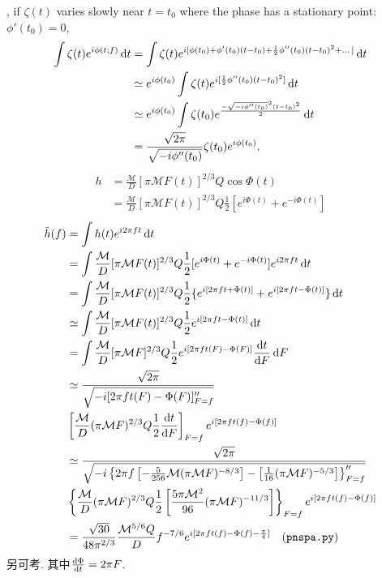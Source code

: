 \cite{Poisson1995}, if $\zeta(t)$ varies slowly near $t=t_0$ where the phase has a stationary point: $\phi'(t_0)=0$,
\begin{align}
    \int\zeta(t)e^{i\phi(t;f)}\,\mathrm{d} t&=\int\zeta(t)e^{i[\phi(t_0)+\phi'(t_0)(t-t_0)+\frac{1}{2}\phi''(t_0)(t-t_0)^2+\dots]}\,\mathrm{d} t\\
    &\simeq e^{i\phi(t_0)}\int\zeta(t)e^{i[\frac{1}{2}\phi''(t_0)(t-t_0)^2]}\,\mathrm{d} t\\
    &\simeq e^{i\phi(t_0)}\int\zeta(t_0)e^{\frac{-\sqrt{-i\phi''(t_0)}^2(t-t_0)^2}{2}}\,\mathrm{d} t\\
    &=\frac{\sqrt{2\pi}}{\sqrt{-i\phi''(t_0)}}\zeta(t_0)e^{i\phi(t_0)}.
\end{align}
\begin{align}
    h&=\frac{\mathcal{M}}{D}[\pi \mathcal{M}F(t)]^{2/3}Q\cos\Phi(t)\\
    &=\frac{\mathcal{M}}{D}[\pi \mathcal{M}F(t)]^{2/3}Q\frac{1}{2}[e^{i\Phi(t)}+e^{-i\Phi(t)}]
\end{align}
\begin{align}
    \tilde{h}(f)&=\int h(t)e^{i2\pi ft}\,\mathrm{d} t\\
    &=\int \frac{\mathcal{M}}{D}[\pi \mathcal{M}F(t)]^{2/3}Q\frac{1}{2}[e^{i\Phi(t)}+e^{-i\Phi(t)}]e^{i2\pi ft}\,\mathrm{d} t\\
    &=\int\frac{\mathcal{M}}{D}[\pi \mathcal{M}F(t)]^{2/3}Q\frac{1}{2}\{e^{i[2\pi ft+\Phi(t)]}+e^{i[2\pi ft-\Phi(t)]}\}\,\mathrm{d} t\\
    &\simeq\int\frac{\mathcal{M}}{D}[\pi \mathcal{M}F(t)]^{2/3}Q\frac{1}{2}e^{i[2\pi ft-\Phi(t)]}\,\mathrm{d} t\\
    &=\int\frac{\mathcal{M}}{D}[\pi \mathcal{M}F]^{2/3}Q\frac{1}{2}e^{i[2\pi ft(F)-\Phi(F)]}\frac{\mathrm{d} t}{\mathrm{d} F}\,\mathrm{d} F\\
    &\simeq\frac{\sqrt{2\pi}}{\sqrt{-i[2\pi ft(F)-\Phi(F)]''_{F=f}}}\\
    &\left[\frac{\mathcal{M}}{D}(\pi \mathcal{M}F)^{2/3}Q\frac{1}{2}\frac{\mathrm{d} t}{\mathrm{d} F}\right]_{F=f}e^{i[2\pi ft(f)-\Phi(f)]}\\
    &\simeq\frac{\sqrt{2\pi}}{\sqrt{-i\left\{2\pi f\left[-\frac{5}{256}\mathcal{M}(\pi \mathcal{M} F)^{-8/3}\right]-\left[\frac{1}{16}(\pi\mathcal{M} F)^{-5/3}\right]\right\}''_{F=f}}}\\
    &\left\{\frac{\mathcal{M}}{D}(\pi \mathcal{M}F)^{2/3}Q\frac{1}{2}\left[\frac{5\pi\mathcal{M}^2}{96}(\pi\mathcal{M} F)^{-11/3}\right]\right\}_{F=f}e^{i[2\pi ft(f)-\Phi(f)]}\\
    &=\frac{\sqrt{30}}{48\pi^{2/3}}\frac{\mathcal{M}^{5/6}Q}{D}f^{-7/6}e^{i[2\pi ft(f)-\Phi(f)-\frac{\pi}{4}]}\quad(\texttt{pnspa.py})
\end{align}
另可考\cite{Arun2005}. 其中$\frac{\mathrm{d} \Phi}{\mathrm{d} t}=2\pi F$.

